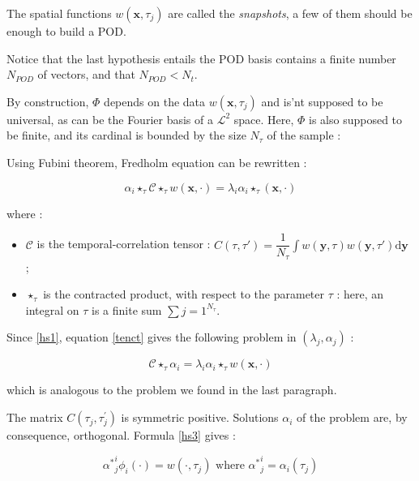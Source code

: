 The spatial functions $w(\mathbf{x}, \tau_j)$ are called the \emph{snapshots}, a few of them should be enough to build a POD.

\par
Notice that the last hypothesis entails the POD basis contains a finite number $N_{POD}$ of vectors, and that $N_{POD}<N_t$.

\par
By construction, $\Phi$ depends on the data $w(\mathbf{x},\tau_j)$ and is'nt supposed to be universal, as can be the Fourier basis of a $\mathcal{L}^2$ space. %
Here, $\Phi$ is also supposed to be finite, and its cardinal is bounded by the size $N_{\tau}$ of the sample :


Using Fubini theorem, Fredholm equation can be rewritten :

\begin{equation}\label{tenct}
\alpha_i\star_{\tau}\mathcal{C}\star_{\tau}w(\mathbf{x},\cdot)=\lambda_i\alpha_i\star_{\tau}(\mathbf{x},\cdot)
\end{equation}

where :
\begin{itemize}
\item $\mathcal{C}$ is the temporal-correlation tensor : $\displaystyle C(\tau,\tau ')=\dfrac{1}{N_{\tau}}\int w(\mathbf{y},\tau)w(\mathbf{y},\tau')\text{d}\mathbf{y}$ ;
\item $\star_{\tau}$ is the contracted product, with respect to the parameter $\tau$ : here, an integral on $\tau$ is a finite sum $\sum\limits{j=1}^{N_{\tau}}$.
\end{itemize}

Since \ref{hs1}, equation \ref{tenct} gives the following problem in $(\lambda_j , \alpha_j)$ :

\begin{equation}\label{tenct}
\mathcal{C}\star_{\tau}\alpha_i\mathbf=\lambda_i\alpha_i\star_{\tau} w(\mathbf{x},\cdot)
\end{equation}

which is analogous to the problem we found in the last paragraph.

\par
The matrix $C(\tau_j,\tau_j^{'})$ is symmetric positive. Solutions $\alpha_i$ of the problem are, by consequence, %
orthogonal. Formula \ref{hs3} gives :

\[{\alpha^{\ast}}_j^i\phi_i(\cdot )=w(\cdot ,\tau_j)\text{ where ${\alpha^{\ast}}_j^i=\alpha_i(\tau_j)$}\]

